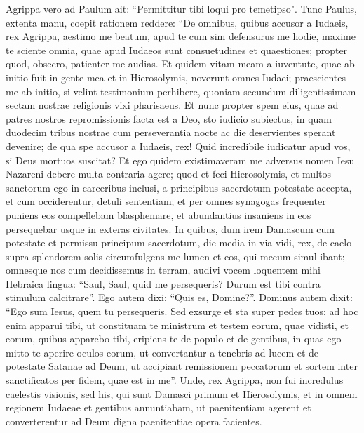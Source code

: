 \begin{biblechapter}  
\verse Agrippa vero ad Paulum ait: “Permittitur tibi loqui pro temetipso". Tunc Paulus, extenta manu, coepit rationem reddere: 
\verse “De omnibus, quibus accusor a Iudaeis, rex Agrippa, aestimo me beatum, apud te cum sim defensurus me hodie, 
\verse maxime te sciente omnia, quae apud Iudaeos sunt consuetudines et quaestiones; propter quod, obsecro, patienter me audias. 
\verse Et quidem vitam meam a iuventute, quae ab initio fuit in gente mea et in Hierosolymis, noverunt omnes Iudaei; 
\verse praescientes me ab initio, si velint testimonium perhibere, quoniam secundum diligentissimam sectam nostrae religionis vixi pharisaeus.  
\verse Et nunc propter spem eius, quae ad patres nostros repromissionis facta est a Deo, sto iudicio subiectus, 
\verse in quam duodecim tribus nostrae cum perseverantia nocte ac die deservientes sperant devenire; de qua spe accusor a Iudaeis, rex! 
\verse Quid incredibile iudicatur apud vos, si Deus mortuos suscitat? 
\verse Et ego quidem existimaveram me adversus nomen Iesu Nazareni debere multa contraria agere; 
\verse quod et feci Hierosolymis, et multos sanctorum ego in carceribus inclusi, a principibus sacerdotum potestate accepta, et cum occiderentur, detuli sententiam; 
\verse et per omnes synagogas frequenter puniens eos compellebam blasphemare, et abundantius insaniens in eos persequebar usque in exteras civitates. 
\verse In quibus, dum irem Damascum cum potestate et permissu principum sacerdotum, 
\verse die media in via vidi, rex, de caelo supra splendorem solis circumfulgens me lumen et eos, qui mecum simul ibant; 
\verse omnesque nos cum decidissemus in terram, audivi vocem loquentem mihi Hebraica lingua: “Saul, Saul, quid me persequeris? Durum est tibi contra stimulum calcitrare”. 
\verse Ego autem dixi: “Quis es, Domine?”. Dominus autem dixit: “Ego sum Iesus, quem tu persequeris.  
\verse Sed exsurge et sta super pedes tuos; ad hoc enim apparui tibi, ut constituam te ministrum et testem eorum, quae vidisti, et eorum, quibus apparebo tibi,  
\verse eripiens te de populo et de gentibus, in quas ego mitto te 
\verse aperire oculos eorum, ut convertantur a tenebris ad lucem et de potestate Satanae ad Deum, ut accipiant remissionem peccatorum et sortem inter sanctificatos per fidem, quae est in me”. 
\verse Unde, rex Agrippa, non fui incredulus caelestis visionis, 
\verse sed his, qui sunt Damasci primum et Hierosolymis, et in omnem regionem Iudaeae et gentibus annuntiabam, ut paenitentiam agerent et converterentur ad Deum digna paenitentiae opera facientes. 

\end{biblechapter}
